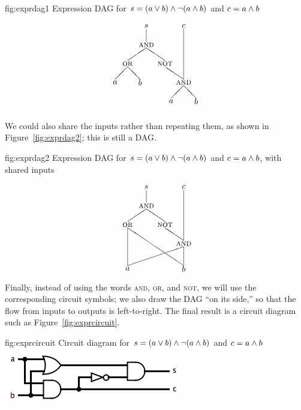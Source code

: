 \fig
	{fig:exprdag1}
	{Expression DAG for $s=(a\vee b)\wedge\lnot(a\wedge b)$ and $c=a\wedge b$}
	{\[ \setlength{\unitlength}{0.75pt}
\begin{picture}(150,140)
\put(10,40){\makebox(0,0){$a$}}
\put(50,40){\makebox(0,0){$b$}}
\put(30,70){\makebox(0,0){\textsc{or}}}
\put(10,45){\line(1,1){20}}
\put(50,45){\line(-1,1){20}}
\put(100,10){\makebox(0,0){$a$}}
\put(140,10){\makebox(0,0){$b$}}
\put(120,40){\makebox(0,0){\textsc{and}}}
\put(100,15){\line(1,1){20}}
\put(140,15){\line(-1,1){20}}
\put(90,70){\makebox(0,0){\textsc{not}}}
\put(120,45){\line(-3,2){30}}
\put(60,100){\makebox(0,0){\textsc{and}}}
\put(30,75){\line(3,2){30}}
\put(90,75){\line(-3,2){30}}
\put(60,130){\makebox(0,0){$s$}}
\put(60,105){\line(0,1){20}}
\put(120,130){\makebox(0,0){$c$}}
\put(120,45){\line(0,1){80}}
\end{picture} \]}

We could also share the inputs rather than repeating them, as shown in Figure~\ref{fig:exprdag2}; this is still a DAG.

\fig
	{fig:exprdag2}
	{Expression DAG for $s=(a\vee b)\wedge\lnot(a\wedge b)$ and $c=a\wedge b$, with shared inputs}
	{\[ \setlength{\unitlength}{0.75pt}
\begin{picture}(110,140)
\put(10,0){\makebox(0,0){$a$}}
\put(100,0){\makebox(0,0){$b$}}
\put(10,70){\makebox(0,0){\textsc{or}}}
\put(10,5){\line(0,1){60}}
\put(100,5){\line(-3,2){90}}
\put(100,40){\makebox(0,0){\textsc{and}}}
\put(10,5){\line(3,1){90}}
\put(100,5){\line(0,1){30}}
\put(70,70){\makebox(0,0){\textsc{not}}}
\put(100,45){\line(-3,2){30}}
\put(40,100){\makebox(0,0){\textsc{and}}}
\put(10,75){\line(3,2){30}}
\put(70,75){\line(-3,2){30}}
\put(40,130){\makebox(0,0){$s$}}
\put(40,105){\line(0,1){20}}
\put(100,130){\makebox(0,0){$c$}}
\put(100,45){\line(0,1){80}}
\end{picture} \]}

Finally, instead of using the words \textsc{and}, \textsc{or}, and \textsc{not}, we will use the corresponding circuit symbols; we also draw the DAG ``on its side,'' so that the flow from inputs to outputs is left-to-right. The final result is a circuit diagram such as Figure~\ref{fig:exprcircuit}.

\fig
	{fig:exprcircuit}
	{Circuit diagram for $s=(a\vee b)\wedge\lnot(a\wedge b)$ and $c=a\wedge b$}
	{\includegraphics[width=!,height=!,scale=0.75]{graphics/HalfAdder.png}}

